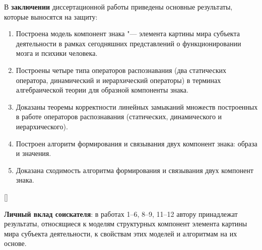 В \textbf{заключении} диссертационной работы приведены основные результаты, которые выносятся на защиту:
\begin{enumerate}
	\renewcommand\labelenumi{\theenumi.}
	\item Построена модель компонент знака "--- элемента картины мира субъекта деятельности в рамках сегодняшних представлений о функционировании мозга и психики человека.
	\item Построены четыре типа операторов распознавания (два статических оператора, динамический и иерархический операторы) в терминах алгебраической теории для образной компоненты знака.
	\item Доказаны теоремы корректности линейных замыканий множеств построенных в работе операторов распознавания (статических, динамического и иерархического).
	\item Построен алгоритм формирования и связывания двух компонент знака: образа и значения.
	\item Доказана сходимость алгоритма формирования и связывания двух компонент знака.
\end{enumerate}

\newpage
\renewcommand{\refname}{\Large Публикации автора по теме диссертации}
\titleformat{\subsection}[display]{}{}{}{\it}[]
\nocite{*}

\textbf{Личный вклад соискателя}: в работах 1--6, 8--9, 11--12 автору принадлежат результаты, относящиеся к моделям структурных компонент элемента картины мира субъекта деятельности, к свойствам этих моделей и алгоритмам на их основе.
